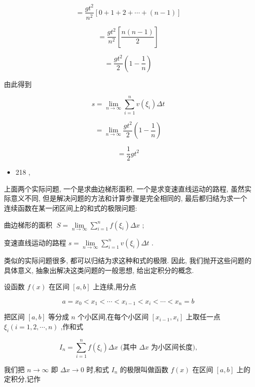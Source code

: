 \documentclass[10pt]{article}
\begin{document}
\[
= \frac{g{t}^{2}}{{n}^{2}}\left\lbrack {0 + 1 + 2 + \cdots + \left( {n - 1}\right) }\right\rbrack
\]

\[
= \frac{g{t}^{2}}{{n}^{2}}\left\lbrack \frac{n\left( {n - 1}\right) }{2}\right\rbrack
\]

\[
= \frac{g{t}^{2}}{2}\left( {1 - \frac{1}{n}}\right)
\]

由此得到

\[
s = \mathop{\lim }\limits_{{n \rightarrow \infty }}\mathop{\sum }\limits_{{i = 1}}^{n}v\left( {\xi }_{i}\right) {\Delta t}
\]

\[
= \mathop{\lim }\limits_{{n \rightarrow \infty }}\frac{g{t}^{2}}{2}\left( {1 - \frac{1}{n}}\right)
\]

\[
= \frac{1}{2}g{t}^{2}
\]

\begin{itemize}
\item 218 ,
\end{itemize}

上面两个实际问题, 一个是求曲边梯形面积, 一个是求变速直线运动的路程, 虽然实际意义不同, 但是解决问题的方法和计算步骤是完全相同的, 最后都归结为求一个连续函数在某一闭区间上的和式的极限问题:

曲边梯形的面积 \(\;S = \mathop{\lim }\limits_{{n \rightarrow \infty }}\mathop{\sum }\limits_{{i = 1}}^{n}f\left( {\xi }_{i}\right) {\Delta x}\) ;

变速直线运动的路程 \(s = \mathop{\lim }\limits_{{n \rightarrow \infty }}\mathop{\sum }\limits_{{i = 1}}^{n}v\left( {\xi }_{i}\right) {\Delta t}\) .

类似的实际问题很多, 都可以归结为求这种和式的极限. 因此, 我们抛开这些问题的具体意义, 抽象出解决这类问题的一般思想, 给出定积分的概念.

设函数 \(f\left( x\right)\) 在区间 \(\left\lbrack {a,b}\right\rbrack\) 上连续,用分点

\[
a = {x}_{0} < {x}_{1} < \cdots < {x}_{i - 1} < {x}_{i} < \cdots < {x}_{n} = b
\]

把区间 \(\left\lbrack {a,b}\right\rbrack\) 等分成 \(n\) 个小区间,在每个小区间 \(\left\lbrack {{x}_{i - 1},{x}_{i}}\right\rbrack\) 上取任一点 \({\xi }_{i}\left( {i = 1,2,\cdots ,n}\right)\) ,作和式

\[
{I}_{n} = \mathop{\sum }\limits_{{i = 1}}^{n}f\left( {\xi }_{i}\right) {\Delta x}\text{ (其中 }{\Delta x}\text{ 为小区间长度),}
\]

我们把 \(n \rightarrow \infty\) 即 \({\Delta x} \rightarrow 0\) 时,和式 \({I}_{n}\) 的极限叫做函数 \(f\left( x\right)\) 在区间 \(\left\lbrack {a,b}\right\rbrack\) 上的定积分,记作
\end{document}
